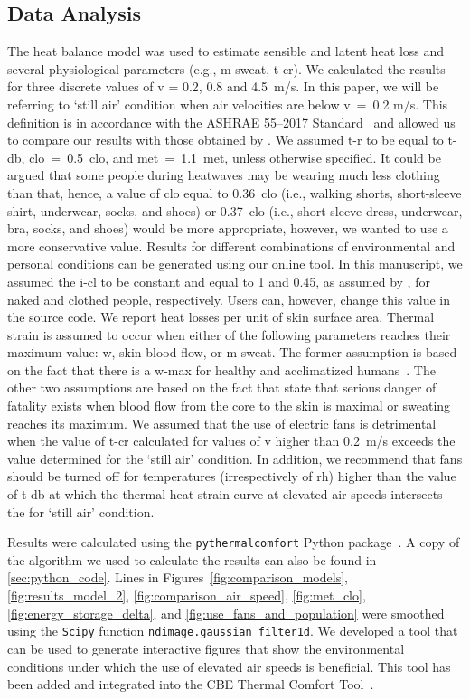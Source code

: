 \subsection{Data Analysis}\label{subsec:data-analysis}

The heat balance model was used to estimate sensible and latent heat loss and several physiological parameters (e.g., \ac{m-sweat}, \ac{t-cr}).
We calculated the results for three discrete values of \ac{v} = 0.2, 0.8 and 4.5~m/s.
In this paper, we will be referring to `still air' condition when air velocities are below \ac{v}~=~0.2 m/s.
This definition is in accordance with the ASHRAE 55--2017 Standard~\cite{ashrae552017} and allowed us to compare our results with those obtained by .
We assumed \ac{t-r} to be equal to \ac{t-db}, \ac{clo}~=~0.5~clo, and \ac{met}~=~1.1~met, unless otherwise specified.
It could be argued that some people during heatwaves may be wearing much less clothing than that, hence, a value of \ac{clo} equal to 0.36~clo (i.e., walking shorts, short-sleeve shirt, underwear, socks, and shoes) or 0.37~clo (i.e., short-sleeve dress, underwear, bra, socks, and shoes) would be more appropriate, however, we wanted to use a more conservative value.
Results for different combinations of environmental and personal conditions can be generated using our online tool.
In this manuscript, we assumed the \ac{i-cl} to be constant and equal to 1 and 0.45, as assumed by , for naked and clothed people, respectively.
Users can, however, change this value in the source code.
We report heat losses per unit of skin surface area.
Thermal strain is assumed to occur when either of the following parameters reaches their maximum value: \ac{w}, skin blood flow, or \ac{m-sweat}.
The former assumption is based on the fact that there is a \ac{w-max} for healthy and acclimatized humans~\cite{ASHRA2017}.
The other two assumptions are based on the fact that  state that serious danger of fatality exists when blood flow from the core to the skin is maximal or sweating reaches its maximum.
We assumed that the use of electric fans is detrimental when the value of \ac{t-cr} calculated for values of \ac{v} higher than 0.2~m/s exceeds the value determined for the `still air' condition.
In addition, we recommend that fans should be turned off for temperatures (irrespectively of \ac{rh}) higher than the value of \ac{t-db} at which the thermal heat strain curve at elevated air speeds intersects the for `still air' condition.

Results were calculated using the  \verb|pythermalcomfort| Python package~\cite{Tartarini2020a}.
A copy of the algorithm we used to calculate the results can also be found in \ref{sec:python_code}.
Lines in Figures~\ref{fig:comparison_models}, \ref{fig:results_model_2}, \ref{fig:comparison_air_speed}, \ref{fig:met_clo}, \ref{fig:energy_storage_delta}, and \ref{fig:use_fans_and_population} were smoothed using the \verb|Scipy| function \verb|ndimage.gaussian_filter1d|.
We developed a tool that can be used to generate interactive figures that show the environmental conditions under which the use of elevated air speeds is beneficial.
This tool has been added and integrated into the CBE Thermal Comfort Tool~\cite{Tartarini2020}.

